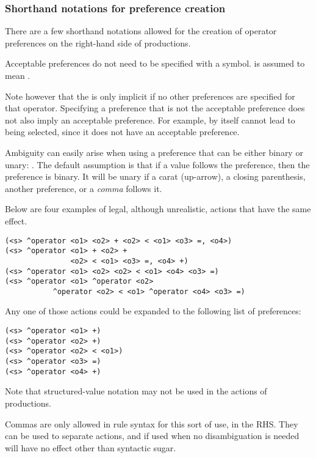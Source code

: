\subsubsection{Shorthand notations for preference creation}

There are a few shorthand notations allowed for the creation of operator preferences on the right-hand side of productions.

Acceptable preferences do not need to be specified with a \soar{+} symbol.  is assumed to mean .

Note however that the \soar{+} is only implicit if no other preferences are specified for that operator. Specifying a preference that is not the acceptable preference does not also imply an acceptable preference. For example,  by itself cannot lead to  being selected, since it does not have an acceptable preference.

Ambiguity can easily arise when using a preference that can be either binary or unary: \soar{> < =}. The default assumption is that if a value follows the preference, then the preference is binary. It will be unary if a carat (up-arrow), a closing parenthesis, another preference, or a \emph{comma} follows it.

Below are four examples of legal, although unrealistic, actions that have the
same effect.

\begin{verbatim}
(<s> ^operator <o1> <o2> + <o2> < <o1> <o3> =, <o4>)
(<s> ^operator <o1> + <o2> +
               <o2> < <o1> <o3> =, <o4> +)
(<s> ^operator <o1> <o2> <o2> < <o1> <o4> <o3> =)
(<s> ^operator <o1> ^operator <o2>
           ^operator <o2> < <o1> ^operator <o4> <o3> =)
\end{verbatim}

Any one of those actions could be expanded to the following list of
preferences:

\begin{verbatim}
(<s> ^operator <o1> +)
(<s> ^operator <o2> +)
(<s> ^operator <o2> < <o1>)
(<s> ^operator <o3> =)
(<s> ^operator <o4> +)
\end{verbatim}

Note that structured-value notation may not be used in the actions of
productions.

Commas are only allowed in rule syntax for this sort of use, in the RHS. They can be used to separate actions, and if used when no disambiguation is needed will have no effect other than syntactic sugar.

